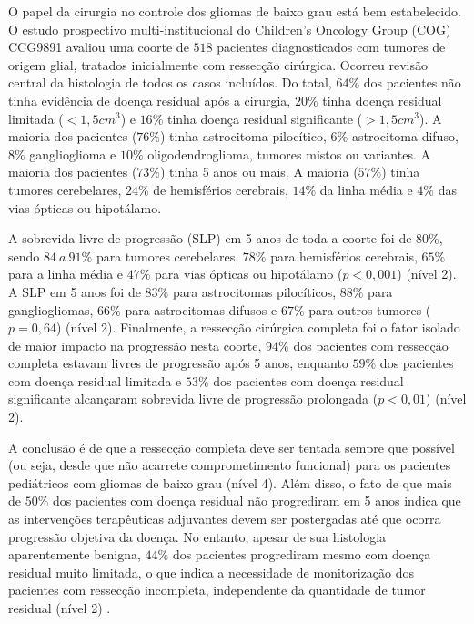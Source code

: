 \documentclass[11pt,a4paper,oldfontcommands]{memoir}
\begin{document}
O papel da cirurgia no controle dos gliomas de baixo grau está bem estabelecido. O estudo prospectivo multi-institucional do Children’s Oncology Group (COG) CCG9891 avaliou uma coorte de \(518\) pacientes diagnosticados com tumores de origem glial, tratados inicialmente com ressecção cirúrgica. Ocorreu revisão central da histologia de todos os casos incluídos. Do total, \(64\%\) dos pacientes não tinha evidência de doença residual após a cirurgia, \(20\%\) tinha doença residual limitada (\(< 1,5 cm^3\)) e \(16\%\) tinha doença residual significante (\(> 1,5 cm^3\)). A maioria dos pacientes (\(76\%\)) tinha astrocitoma pilocítico, \(6\%\) astrocitoma difuso, \(8\%\) ganglioglioma e \(10\%\) oligodendroglioma, tumores mistos ou variantes. A maioria dos pacientes (\(73\%\)) tinha 5 anos ou mais. A maioria (\(57\%\)) tinha tumores cerebelares, \(24\%\) de hemisférios cerebrais, \(14\%\) da linha média e \(4\%\) das vias ópticas ou hipotálamo. 

A sobrevida livre de progressão (SLP) em 5 anos de toda a coorte foi de \(80\%\), sendo \(84 \:a\: 91\%\) para tumores cerebelares, \(78\%\) para hemisférios cerebrais, \(65\%\) para a linha média e \(47\%\) para vias ópticas ou hipotálamo (\(p<0,001\)) (nível 2). A SLP em 5 anos foi de \(83\%\) para astrocitomas pilocíticos, \(88\%\) para gangliogliomas, \(66\%\) para astrocitomas difusos e \(67\%\) para outros tumores (\(p=0,64\)) (nível 2). Finalmente, a ressecção cirúrgica completa foi o fator isolado de maior impacto na progressão nesta coorte, \(94\%\) dos pacientes com ressecção completa estavam livres de progressão após 5 anos, enquanto \(59\%\) dos pacientes com doença residual limitada e \(53\%\) dos pacientes com doença residual significante alcançaram sobrevida livre de progressão prolongada (\(p<0,01\)) (nível 2). 

A conclusão é de que a ressecção completa deve ser tentada sempre que possível (ou seja, desde que não acarrete comprometimento funcional) para os pacientes pediátricos com gliomas de baixo grau (nível 4). Além disso, o fato de que mais de \(50\%\) dos pacientes com doença residual não progrediram em 5 anos indica que as intervenções terapêuticas adjuvantes devem ser postergadas até que ocorra progressão objetiva da doença. No entanto, apesar de sua histologia aparentemente benigna, \(44\%\) dos pacientes progrediram mesmo com doença residual muito limitada, o que indica a necessidade de monitorização dos pacientes com ressecção incompleta, independente da quantidade de tumor residual (nível 2) \cite{wisof}.
\end{document}
